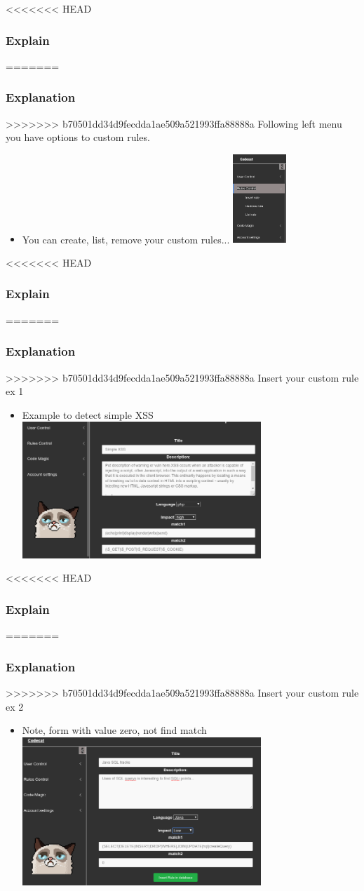 \documentclass[serif,mathserif]{beamer}
\begin{document}
\begin{frame}
<<<<<<< HEAD
  \frametitle{Explain}
=======
  \frametitle{Explanation}
>>>>>>> b70501dd34d9fecdda1ae509a521993ffa88888a
  Following left menu you have options to custom rules.
  \begin{itemize}
  \item You can create, list, remove your custom rules...
  \includegraphics[width=2cm]{images/menu1.png} 
  \end{itemize}
\end{frame}

\begin{frame}
<<<<<<< HEAD
  \frametitle{Explain}
=======
  \frametitle{Explanation}
>>>>>>> b70501dd34d9fecdda1ae509a521993ffa88888a
  Insert your custom rule ex 1
  \begin{itemize}
  \item Example to detect simple XSS 	  
  \includegraphics[width=9cm]{images/insertrule2.png} 
  \end{itemize}
\end{frame}

\begin{frame}
<<<<<<< HEAD
  \frametitle{Explain}
=======
  \frametitle{Explanation}
>>>>>>> b70501dd34d9fecdda1ae509a521993ffa88888a
  Insert your custom rule ex 2
  \begin{itemize}
  \item Note, form with value zero, not find match	  
  \includegraphics[width=9cm]{images/insertrule.png} 
  \end{itemize}
\end{frame}
\end{document}
